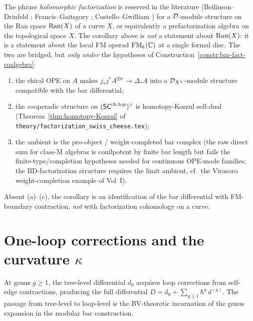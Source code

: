 \begin{remark}
The phrase \emph{holomorphic factorization} is reserved in the
literature \textup{(}Beilinson--Drinfeld \cite{BD04};
Francis--Gaitsgory \cite{FG12}; Costello--Gwilliam
\cite{CG16,CG21}\textup{)} for a $\mathcal{D}$-module structure on
the Ran space $\operatorname{Ran}(X)$ of a curve $X$, or equivalently a
prefactorization algebra on the topological space $X$. The
corollary above is \emph{not} a statement about
$\operatorname{Ran}(X)$: it is a statement about the local FM operad
$\operatorname{FM}_k(\mathbb{C})$ at a single formal disc. The two are bridged,
but \emph{only under} the hypotheses of
Construction~\ref{constr:bar-fact-coalgebra}:
\begin{enumerate}[label=\textup{(\alph*)}]
\item the chiral OPE on $A$ makes
$j_* j^* A^{\boxtimes n} \to \Delta_* A$ into a
$\mathcal{D}_{X^n}$-module structure compatible with the bar
differential;
\item the cooperadic structure on $(\mathsf{SC}^{\mathrm{ch,top}})^{\vee}$ is
homotopy-Koszul self-dual \textup{(}Theorem~\ref{thm:homotopy-Koszul}
of \texttt{theory/factorization\_swiss\_cheese.tex}\textup{)};
\item the ambient is the pro-object /
weight-completed bar complex \textup{(}the raw direct sum for
class-M algebras is conilpotent by finite bar length but fails the
finite-type/completion hypotheses needed for continuous OPE-mode
families; the BD-factorization structure requires the limit
ambient, cf.\ the Virasoro weight-completion example of Vol~I\textup{)}.
\end{enumerate}
Absent (a)--(c), the corollary is an identification of the
bar differential with FM-boundary contraction, \emph{not} with
factorization cohomology on a curve.
\end{remark}



\section{One-loop corrections and the curvature
\texorpdfstring{$\kappa$}{kappa}}
\label{sec:thqg-bv-ext-one-loop}
At genus $g \geq 1$, the tree-level differential $d_0$ acquires
loop corrections from self-edge contractions, producing the full
differential $D = d_0 + \sum_{g \geq 1} \hbar^g\, d^{(g)}$.
The passage from tree-level to loop-level is the BV-theoretic
incarnation of the genus expansion in the modular bar construction.

